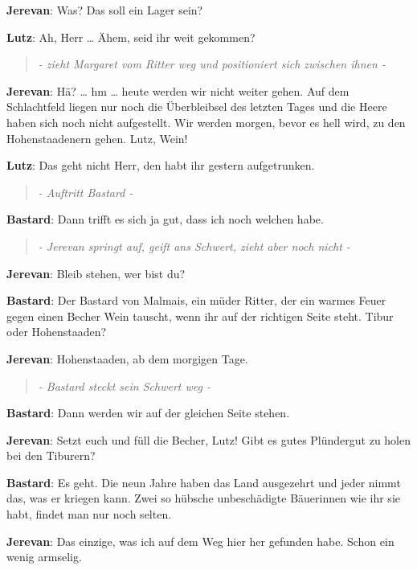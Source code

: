 \documentclass[a5paper,7pt, twocolumn]{book}
\begin{document}
\textbf{Jerevan}: Was? Das soll ein Lager sein?

\textbf{Lutz}: Ah, Herr … Ähem, seid ihr weit gekommen?

\begin{quote}
  \textit{- zieht Margaret vom Ritter weg und positioniert sich zwischen ihnen -}
 \end{quote}

\textbf{Jerevan}: Hä? … hm … heute werden wir nicht weiter gehen. Auf dem Schlachtfeld liegen nur noch die Überbleibsel des letzten Tages und die Heere haben sich noch nicht aufgestellt. Wir werden morgen, bevor es hell wird, zu den Hohenstaadenern gehen.
Lutz, Wein!

\textbf{Lutz}: Das geht nicht Herr, den habt ihr gestern aufgetrunken.

\begin{quote}
  \textit{- Auftritt Bastard -}
 \end{quote}



\textbf{Bastard}: Dann trifft es sich ja gut, dass ich noch welchen habe.

\begin{quote}
  \textit{- Jerevan springt auf, geift ans Schwert, zieht aber noch nicht -}
 \end{quote}

\textbf{Jerevan}: Bleib stehen, wer bist du?

\textbf{Bastard}: Der Bastard von Malmais, ein müder Ritter, der ein warmes Feuer gegen einen Becher Wein tauscht, wenn ihr auf der richtigen Seite steht.
Tibur oder Hohenstaaden?

\textbf{Jerevan}: Hohenstaaden, ab dem morgigen Tage.


\begin{quote}
  \textit{- Bastard steckt sein Schwert weg -}
 \end{quote}


\textbf{Bastard}: Dann werden wir auf der gleichen Seite stehen.

\textbf{Jerevan}: Setzt euch und füll die Becher, Lutz!
Gibt es gutes Plündergut zu holen bei den Tiburern?

\textbf{Bastard}: Es geht. Die neun Jahre haben das Land ausgezehrt und jeder nimmt das, was er kriegen kann. Zwei so hübsche unbeschädigte Bäuerinnen wie ihr sie habt, findet man nur noch selten.

\textbf{Jerevan}: Das einzige, was ich  auf dem Weg hier her gefunden habe. Schon ein wenig armselig.
\end{document}
